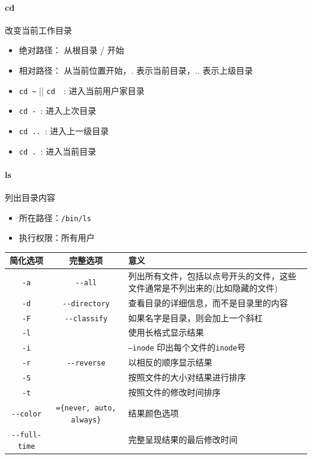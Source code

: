 \documentclass[UTF8,a4paper,12pt]{ctexbook}
\begin{document}
		\paragraph{cd}改变当前工作目录
			\begin{itemize}[itemindent = 1em]
				\item 绝对路径： 从根目录 / 开始
				\item 相对路径： 从当前位置开始，. 表示当前目录，.. 表示上级目录
				\item \verb|cd ~| || \verb|cd  |: 进入当前用户家目录
				\item \verb|cd - |: 进入上次目录
				\item \verb|cd .. |: 进入上一级目录
				\item \verb|cd . |: 进入当前目录
			\end{itemize}
			
		\paragraph{ls}列出目录内容
			\begin{itemize}[itemindent = 1em]
				\item 所在路径：\verb|/bin/ls|
				\item 执行权限：所有用户
			\end{itemize}
			\begin{table}[H]
				\centering
				\caption{\textbf{ls }参数说明}
				\begin{longtable}{c|c|m{10cm}}
					\toprule[1.5pt]
					简化选项 & 完整选项 & 意义\\
					\midrule
					\verb|-a|  & \verb|--all| & 列出所有文件，包括以点号开头的文件，这些文件通常是不列出来的(比如隐藏的文件)\\
					\verb|-d|  & \verb|--directory| & 查看目录的详细信息，而不是目录里的内容\\
					\verb|-F|  & \verb|--classify|  & 如果名字是目录，则会加上一个斜杠\\
					\verb|-l|  & 			  & 使用长格式显示结果\\
					\verb|-i|  &			  & \verb|–inode| 印出每个文件的\verb|inode|号\\
					\verb|-r|  & \verb|--reverse|   & 以相反的顺序显示结果\\
					\verb|-S|  & 			  & 按照文件的大小对结果进行排序\\
					\verb|-t|  &			  & 按照文件的修改时间排序\\
					\verb|--color|  	& 	\verb|={never, auto, always}|			  & 结果颜色选项\\
					\verb|--full-time|  &	\verb| |		 						  & 完整呈现结果的最后修改时间 \\
					\bottomrule[1.5pt]
				\end{longtable}
			\end{table}
				
\end{document}
